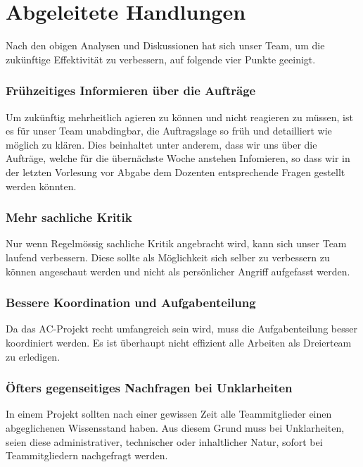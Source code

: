 
\chapter{Abgeleitete Handlungen}

Nach den obigen Analysen und Diskussionen hat sich unser Team, um die zukünftige Effektivität zu verbessern, auf folgende vier Punkte geeinigt.  

\subsection*{Frühzeitiges Informieren über die Aufträge}

Um zukünftig mehrheitlich agieren zu können und nicht reagieren zu müssen, ist es für unser Team unabdingbar, die Auftragslage so früh und detailliert wie möglich zu klären. Dies beinhaltet unter anderem, dass wir uns über die Aufträge, welche für die übernächste Woche anstehen Infomieren, so dass wir in der letzten Vorlesung vor Abgabe dem Dozenten entsprechende Fragen gestellt werden könnten. 

\subsection*{Mehr sachliche Kritik}  

Nur wenn Regelmössig sachliche Kritik angebracht wird, kann sich unser Team laufend verbessern. Diese sollte als Möglichkeit sich selber zu verbessern zu können angeschaut werden und nicht als persönlicher Angriff aufgefasst werden. 

\subsection*{Bessere Koordination und Aufgabenteilung}

Da das AC-Projekt recht umfangreich sein wird, muss die Aufgabenteilung besser koordiniert werden. Es ist überhaupt nicht effizient alle Arbeiten als Dreierteam zu erledigen. 

\subsection*{Öfters gegenseitiges Nachfragen bei Unklarheiten}

In einem Projekt sollten nach einer gewissen Zeit alle Teammitglieder einen abgeglichenen Wissensstand haben. Aus diesem Grund muss bei Unklarheiten, seien diese administrativer, technischer oder inhaltlicher Natur, sofort bei Teammitgliedern nachgefragt werden.


\nocite{lencioni2010five}